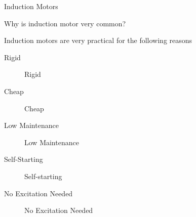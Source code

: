 \documentclass{beamer}
\begin{document}
\begin{frame}{Induction Motors}

    \begin{block}{Why is induction motor very common?}

        Induction motors are very practical for the following reasons

        \begin{description}
            \item[Rigid] Rigid
            \item[Cheap] Cheap
            \item[Low Maintenance] Low Maintenance
            \item[Self-Starting] Self-starting
            \item[No Excitation Needed] No Excitation Needed
        \end{description}

    \end{block}

\end{frame}
\end{document}
